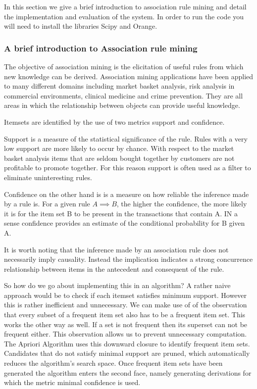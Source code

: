 In this section we give a brief introduction to association rule mining and detail the implementation and evaluation of the system. In order to run the code you will need to install the libraries Scipy and Orange.

\subsubsection{A brief introduction to Association rule mining}

The objective of association  mining is the elicitation of useful rules from which new knowledge can be derived. Association mining applications have been applied to many different domains including market basket analysis, risk analysis in commercial environments, clinical medicine and crime prevention. They are all areas in which the relationship between objects can provide useful knowledge.

Itemsets are identified by the use of two metrics support and confidence.

Support is a measure of the statistical significance of the rule. Rules with a very low support are more likely to occur by chance. With respect to the market basket analysis items that are seldom bought together by customers are not profitable to promote together. For this reason support is often used as a filter to eliminate uninteresting rules.

Confidence on the other hand is is a measure on how reliable the inference made by a rule is. For a given rule $A \implies B$, the higher the confidence, the more likely it is for the item set B to be present in the transactions that contain A. IN a sense confidence provides an estimate of the conditional probability for B given A.

It is worth noting that the inference made by an association rule does not necessarily imply causality. Instead the implication indicates a strong concurrence relationship between items in the antecedent and consequent of the rule.

So how do we go about implementing this in an algorithm? A rather naive approach would be to check if each itemset satisfies minimum support. However this is rather inefficient and unnecessary. We can make use of of the observation that every subset of a frequent item set also has to be a frequent item set. This works the other way as well. If a set is not frequent then its superset can not be frequent either. This observation allows us to prevent unnecessary computation. The Apriori Algorithm uses this downward closure to identify frequent item sets. Candidates that do not satisfy minimal support are pruned, which automatically reduces the algorithm's search space. Once frequent item sets have been generated the algorithm enters the second face, namely generating derivations for which the metric minimal confidence is used.

